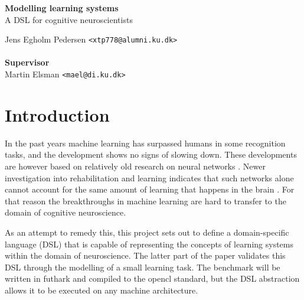 \documentclass[a4paper,oneside]{memoir}
\begin{document}
    \thispagestyle{empty}
    \begin{adjustwidth}{-3cm}{-1.5cm}
    \vspace*{2.5cm}
    \textbf{\Huge Modelling learning systems} \\
    \vspace*{.8cm}
    {\huge  A DSL for cognitive neuroscientists}\\
    \begin{tabbing}
    Jens Egholm Pedersen \hspace{1cm} \= \texttt{<xtp778@alumni.ku.dk>} \\
    \\[11cm]

    \textbf{\Large Supervisor} \\
    Martin Elsman \hspace{1cm} \texttt{<mael@di.ku.dk>}
    \end{tabbing}
    \end{adjustwidth}

    \newpage

    \ClearWallPaper


\section{Introduction}
In the past years machine learning has surpassed humans in some recognition
tasks, and the development shows no signs of slowing down.
These developments are however based on relatively old research on neural
networks \autocite{Nilsson2009, russel2007}.
Newer investigation into rehabilitation and learning indicates that such
networks alone cannot account for the same amount of learning that happens
in the brain \autocite{Mogensen2011, block2007, russel2007, Moravec98, dennett2017}.
For that reason the breakthroughs in machine learning are hard to transfer
to the domain of cognitive neuroscience.

As an attempt to remedy this, this project sets out to define a domain-specific
language (DSL) that is capable of representing the concepts of learning systems
within the domain of neuroscience.
The latter part of the paper validates this DSL through the modelling of a small
learning task. The benchmark will be written in \gls{futhark} and compiled to
the \gls{opencl} standard, but the DSL abstraction allows it to be executed on
any machine architecture.
\end{document}
